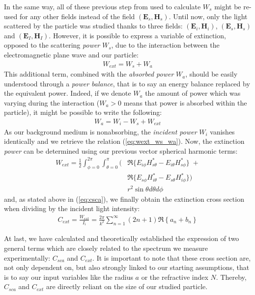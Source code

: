 \documentclass{article}
\numberwithin{equation}{section}
\begin{document}
In the same way, all of these previous step from used to calculate $W_{s}$ might be re-used for any other fields instead of the field $(\textbf{E}_{s}, \textbf{H}_{s})$. Until now, only the light scattered by the particle was studied thanks to three fields: $(\textbf{E}_{i}, \textbf{H}_{i})$, $(\textbf{E}_{s}, \textbf{H}_{s})$ and $(\textbf{E}_{I}, \textbf{H}_{I})$. However, it is possible to express a variable of extinction, opposed to the scattering \textit{power} $W_{s}$, due to the interaction between the electromagnetic plane wave and our particle:
\begin{align}\label{eq:wext_ws_wa}
W_{ext} = W_{s} + W_{a}
\end{align}
This additional term, combined with the \textit{absorbed power} $W_{a}$, should be easily understood through a \textit{power balance}, that is to say an energy balance replaced by the equivalent power. Indeed, if we denote $W_{a}$ the amount of power which was varying during the interaction ($W_{a} > 0$ means that power is absorbed within the particle), it might be possible to write the following:
\begin{align}
W_{a} = W_{i} - W_{s} + W_{ext}
\end{align}
As our background medium is nonabsorbing, the \textit{incident power} $W_{i}$ vanishes identically and we retrieve the relation (\ref{eq:wext_ws_wa}). Now, the extinction \textit{power} can be determined using our previous vector spherical harmonic terms:
\begin{equation}
\begin{aligned}
W_{ext}=\frac{1}{2}\int_{\phi=0}^{2\pi}\int_{\theta=0}^{\pi} (&\Re\{E_{i\phi}H^{*}_{s\theta} - E_{i\theta}H^{*}_{s\phi}\}\; +\\
&\Re\{E_{s\phi}H^{*}_{i\theta} - E_{s\theta}H^{*}_{i\phi}\}) \\
&r^{2}\sin\theta d\theta d\phi
\end{aligned}
\end{equation}
and, as stated above in (\ref{eq:csca}), we finally obtain the extinction cross section when dividing by the incident light intensity:
\begin{align}\label{eq:cext}
C_{ext}=\frac{W_{ext}}{I_{i}}=\frac{2\pi}{k^{2}}\sum_{n=1}^{\infty }(2n+1)\Re\left\{a_{n} + b_{n} \right\}
\end{align}

At last, we have calculated and theoretically established the expression of two general terms which are closely related to the spectrum we measure experimentally: $C_{sca}$ and $C_{ext}$. It is important to note that these cross section are, not only dependent on, but also strongly linked to our starting assumptions, that is to say our input variables like the radius $a$ or the refractive index $N$. Thereby, $C_{sca}$ and $C_{ext}$ are directly reliant on the size of our studied particle.
\end{document}

